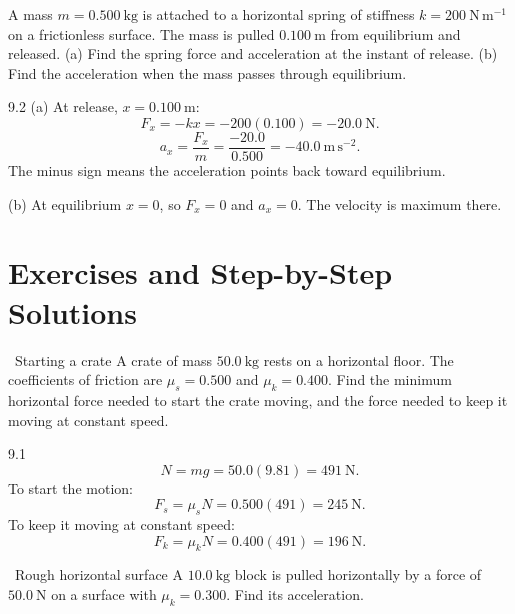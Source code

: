 \begin{worked}
A mass $m=0.500\ \mathrm{kg}$ is attached to a horizontal spring of stiffness
$k=200\ \mathrm{N\,m^{-1}}$ on a frictionless surface. The mass is pulled
$0.100\ \mathrm{m}$ from equilibrium and released.
(a) Find the spring force and acceleration at the instant of release.
(b) Find the acceleration when the mass passes through equilibrium.
\end{worked}

\begin{solution}{9.2}
(a) At release, $x=0.100\ \mathrm{m}$:
\[
F_x=-kx=-200(0.100)=-20.0\ \mathrm{N}.
\]
\[
a_x=\frac{F_x}{m}=\frac{-20.0}{0.500}=-40.0\ \mathrm{m\,s^{-2}}.
\]
The minus sign means the acceleration points back toward equilibrium.

(b) At equilibrium $x=0$, so $F_x=0$ and $a_x=0$. The velocity is maximum there.
\end{solution}

\section{Exercises and Step-by-Step Solutions}

\begin{exercise}{\warm\ Starting a crate}
A crate of mass $50.0\ \mathrm{kg}$ rests on a horizontal floor. The coefficients
of friction are $\mu_s=0.500$ and $\mu_k=0.400$. Find the minimum horizontal force
needed to start the crate moving, and the force needed to keep it moving at
constant speed.
\end{exercise}

\begin{tabletworkspace}[6.5cm]
\end{tabletworkspace}

\begin{solution}{9.1}
\[
N=mg=50.0(9.81)=491\ \mathrm{N}.
\]
To start the motion:
\[
F_s=\mu_sN=0.500(491)=245\ \mathrm{N}.
\]
To keep it moving at constant speed:
\[
F_k=\mu_kN=0.400(491)=196\ \mathrm{N}.
\]
\end{solution}

\begin{exercise}{\warm\ Rough horizontal surface}
A $10.0\ \mathrm{kg}$ block is pulled horizontally by a force of
$50.0\ \mathrm{N}$ on a surface with $\mu_k=0.300$. Find its acceleration.
\end{exercise}

